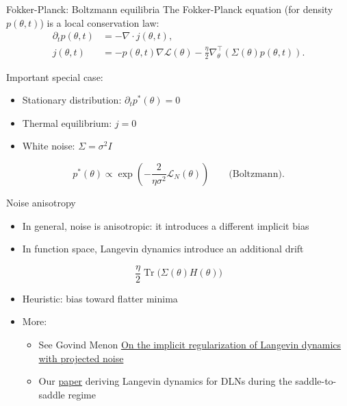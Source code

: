 \documentclass[aspectratio=169,11pt]{beamer}
\begin{document}
\begin{frame}{Fokker-Planck: Boltzmann equilibria}
  \small
  The Fokker-Planck equation (for density $p(\theta,t)$) is a local conservation law:
  \[
    \begin{aligned}
      \partial_t p(\theta,t) &= -\nabla\!\cdot j(\theta,t), \\
      j(\theta,t)
      &=
      -p(\theta,t)\nabla \mathcal{L}(\theta)
      -\frac{\eta}{2}\nabla_\theta^{\top}\!\left(\Sigma(\theta)p(\theta,t)\right).
    \end{aligned}
  \]

  Important special case:
  \begin{itemize}
    \item Stationary distribution: $\partial_t p^{\ast}(\theta)=0$
    \item Thermal equilibrium: $j=0$
    \item White noise: $\Sigma=\sigma^2 I$
  \end{itemize}

  \[
    p^{\ast}(\theta)
    \propto
    \exp\!\left(-\frac{2}{\eta\sigma^2}\mathcal{L}_N(\theta)\right)
    \qquad \text{(Boltzmann)}.
  \]
\end{frame}

\begin{frame}{Noise anisotropy}
  \small
  \begin{itemize}
    \item In general, noise is anisotropic: it introduces a different implicit bias
    \item In function space, Langevin dynamics introduce an additional drift
  \end{itemize}

  \[
    \frac{\eta}{2}\operatorname{Tr}\!\bigl(\Sigma(\theta)H(\theta)\bigr)
  \]

  \begin{itemize}
    \item Heuristic: bias toward flatter minima
    \item More:
      \begin{itemize}
        \item See Govind Menon \href{https://arxiv.org/abs/2602.12257}{On the implicit regularization of Langevin dynamics with projected noise}
        \item Our \href{https://arxiv.org/html/2604.06366v1}{paper} deriving Langevin dynamics for DLNs during the saddle-to-saddle regime
      \end{itemize}
  \end{itemize}
\end{frame}
\end{document}
